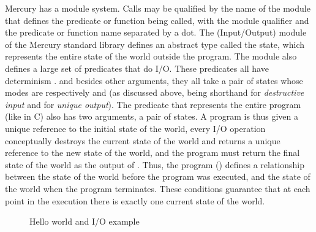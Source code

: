 Mercury has a module system.
Calls may be qualified by the name of the module
that defines the predicate or function being called,
with the module qualifier and the predicate or function name
separated by a dot.
The \io (Input/Output) module of the Mercury standard library
defines an abstract type called the \io state,
which represents the entire state of the world outside the program.
The \io module also defines a large set of predicates that do I/O.
These predicates all have determinism \ddet.
and besides other arguments,
they all take a pair of \io states
whose modes are respectively \di and \uo
(as discussed above, \di being shorthand for \emph{destructive input}
and \uo for \emph{unique output}).
The  predicate that represents the entire program
(like  in C)
also has two arguments, a  pair of \io states.
A program is thus given
a unique reference to the initial state of the world,
every I/O operation conceptually destroys the current state of the world
and returns a unique reference to the new state of the world,
and the program must return the final state of the world
as the output of .
Thus, the program () defines a relationship between the state
of the world before the program was executed,
and the state of the world when the program terminates.
These conditions guarantee that at each point in the execution
there is exactly one current state of the world.

\begin{figure}
\begin{center}
\begin{minipage}[b]{0.49\textwidth}
\end{minipage}
%
\begin{minipage}[b]{0.49\textwidth}
\end{minipage}
\end{center}
\caption{Hello world and I/O example}
\label{fig:hello}
\end{figure}

